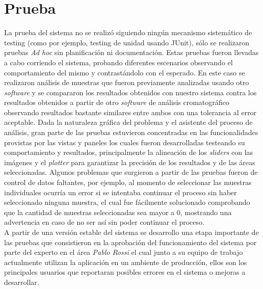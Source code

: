 \section{Prueba}
La prueba del sistema no se realiz\'o siguiendo ning\'un mecanismo sistem\'atico de testing (como por ejemplo, testing de unidad usando JUnit), s\'olo se realizaron pruebas \textit{Ad hoc} sin planificaci\'on ni documentaci\'on. Estas pruebas fueron llevadas a cabo corriendo el sistema, probando diferentes escenarios observando el comportamiento del mismo y contrast\'andolo con el esperado. En este caso se realizaron an\'alisis de muestras que fueron previamente analizadas usando otro \textit{software} y se compararon los resultados obtenidos con nuestro sistema contra los resultados obtenidos a partir de otro \textit{software} de an\'alisis cromatogr\'afico observando resultados bastante similares entre ambos con una tolerancia al error aceptable. Dada la naturaleza gr\'afica del problema y el asistente del proceso de an\'alisis, gran parte de las pruebas estuvieron concentradas en las funcionalidades provistas por las vistas y paneles los cuales fueron desarrolladas testeando su comportamiento y resultados, principalmente la alineaci\'on de los \textit{sliders} con las im\'agenes y el \textit{plotter} para garantizar la precisi\'on de los resultados y de las \'areas seleccionadas. Algunos problemas que surgieron a partir de las pruebas fueron de control de datos faltantes, por ejemplo, al momento de seleccionar las muestras individuales ocurr\'ia un error si se intentaba continuar el proceso sin haber seleccionado ninguna muestra, el cual fue f\'acilmente solucionado comprobando que la cantidad de muestras seleccionadas sea mayor a 0, mostrando una advertencia en caso de no ser as\'i sin poder continuar el proceso.\\
A partir de una versi\'on estable del sistema se desarrollo una etapa importante de las pruebas que consistieron en la aprobaci\'on del funcionamiento del sistema por parte del experto en el \'area \emph{Pablo Rossi} el cual junto a su equipo de trabajo actualmente utilizan la aplicaci\'on en un ambiente de producci\'on, ellos son los principales usuarios que reportaran posibles errores en el sistema o mejoras a desarrollar.
